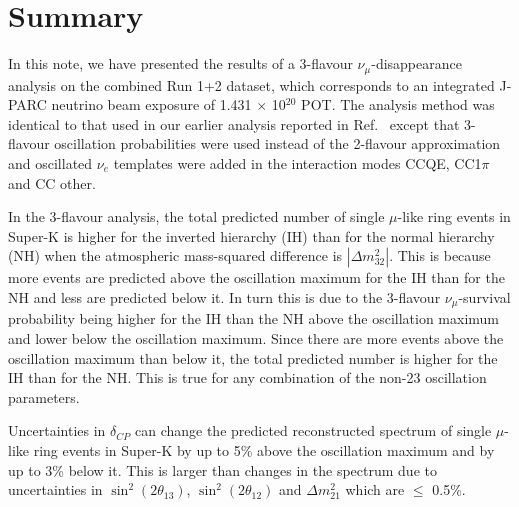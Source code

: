 \clearpage 

\section {Summary }
\label{sec:summary}

In this note, we have presented the results of a 3-flavour $\nu_{\mu}$-disappearance analysis 
on the combined Run 1+2 dataset, which corresponds to an integrated J-PARC neutrino beam exposure 
of 1.431 $\times$ 10$^{20}$ POT. The analysis method was identical to that used in our earlier analysis
reported in Ref.\ \cite{OurRun1and2Analysis2F} except that 3-flavour oscillation probabilities were 
used instead of the 2-flavour approximation and oscillated $\nu_{e}$ templates were added in the interaction 
modes CCQE, CC1$\pi$ and CC other. 

In the 3-flavour analysis, the total predicted number of single $\mu$-like ring events in Super-K is higher 
for the inverted hierarchy (IH) than for the normal hierarchy (NH) when the atmospheric mass-squared difference 
is $|\Delta m^{2}_{32}|$. This is because more events are predicted above the oscillation maximum for the IH than 
for the NH and less are predicted below it. In turn this is due to the 3-flavour $\nu_{\mu}$-survival probability 
being higher for the IH than the NH above the oscillation maximum and lower below the oscillation maximum. Since 
there are more events above the oscillation maximum than below it, the total predicted number is higher for the 
IH than for the NH. This is true for any combination of the non-23 oscillation parameters. 

Uncertainties in $\delta_{CP}$ can change the predicted reconstructed spectrum of single $\mu$-like ring events 
in Super-K by up to 5\% above the oscillation maximum and by up to 3\% below it. This is larger than changes 
in the spectrum due to uncertainties in $\sin^{2}(2 \theta_{13})$, $\sin^{2}(2 \theta_{12})$ and $\Delta m_{21}^{2}$ 
which are $\leq$ 0.5\%.

